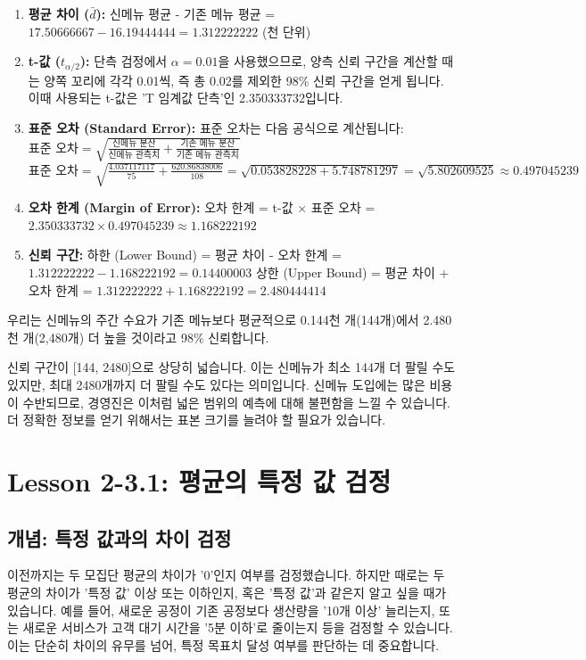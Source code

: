 \documentclass[11pt,a4paper]{article}
\theoremstyle{definition}
\begin{document}
\begin{enumerate}
    \item \textbf{평균 차이 ($\bar{d}$):}
    신메뉴 평균 - 기존 메뉴 평균 = $17.50666667 - 16.19444444 = 1.312222222$ (천 단위)
    \item \textbf{t-값 ($t_{\alpha/2}$):}
    단측 검정에서 $\alpha = 0.01$을 사용했으므로, 양측 신뢰 구간을 계산할 때는 양쪽 꼬리에 각각 0.01씩, 즉 총 0.02를 제외한 98\% 신뢰 구간을 얻게 됩니다. 이때 사용되는 t-값은 'T 임계값 단측'인 2.350333732입니다.
    \item \textbf{표준 오차 (Standard Error):}
    표준 오차는 다음 공식으로 계산됩니다:
    $\text{표준 오차} = \sqrt{\frac{\text{신메뉴 분산}}{\text{신메뉴 관측치}} + \frac{\text{기존 메뉴 분산}}{\text{기존 메뉴 관측치}}}$
    $\text{표준 오차} = \sqrt{\frac{4.037117117}{75} + \frac{620.86838006}{108}} = \sqrt{0.053828228 + 5.748781297} = \sqrt{5.802609525} \approx 0.497045239$
    \item \textbf{오차 한계 (Margin of Error):}
    오차 한계 = t-값 $\times$ 표준 오차 = $2.350333732 \times 0.497045239 \approx 1.168222192$
    \item \textbf{신뢰 구간:}
    하한 (Lower Bound) = 평균 차이 - 오차 한계 = $1.312222222 - 1.168222192 = 0.14400003$
    상한 (Upper Bound) = 평균 차이 + 오차 한계 = $1.312222222 + 1.168222192 = 2.480444414$
\end{enumerate}

\begin{summarybox}[title=98\% 신뢰 구간 해석]
우리는 신메뉴의 주간 수요가 기존 메뉴보다 평균적으로 0.144천 개(144개)에서 2.480천 개(2,480개) 더 높을 것이라고 98\% 신뢰합니다.
\end{summarybox}

\begin{warningbox}[title=경영진의 의사결정]
신뢰 구간이 [144, 2480]으로 상당히 넓습니다. 이는 신메뉴가 최소 144개 더 팔릴 수도 있지만, 최대 2480개까지 더 팔릴 수도 있다는 의미입니다. 신메뉴 도입에는 많은 비용이 수반되므로, 경영진은 이처럼 넓은 범위의 예측에 대해 불편함을 느낄 수 있습니다. 더 정확한 정보를 얻기 위해서는 표본 크기를 늘려야 할 필요가 있습니다.
\end{warningbox}

\newpage
\section{Lesson 2-3.1: 평균의 특정 값 검정}

\subsection{개념: 특정 값과의 차이 검정}
이전까지는 두 모집단 평균의 차이가 '0'인지 여부를 검정했습니다. 하지만 때로는 두 평균의 차이가 '특정 값' 이상 또는 이하인지, 혹은 '특정 값'과 같은지 알고 싶을 때가 있습니다. 예를 들어, 새로운 공정이 기존 공정보다 생산량을 '10개 이상' 늘리는지, 또는 새로운 서비스가 고객 대기 시간을 '5분 이하'로 줄이는지 등을 검정할 수 있습니다. 이는 단순히 차이의 유무를 넘어, 특정 목표치 달성 여부를 판단하는 데 중요합니다.
\end{document}
